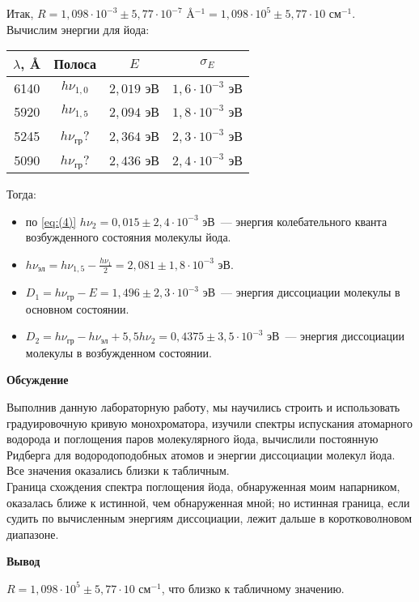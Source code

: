 \documentclass[12pt]{article}
\begin{document}
Итак, $R= 1,098 \cdot 10^{-3} \pm 5,77 \cdot 10^{-7}$ \AA$^{-1} = 1,098 \cdot
10^5 \pm 5,77\cdot 10$ см$^{-1}$.
\\
Вычислим энергии для йода:
\begin{center}
    \begin{tabular}{|c|c|c|c|}
      \hline
      $\lambda$, \AA & Полоса & $E$ & $\sigma_E$\\ \hline
      6140 &$h\nu_{1,0}$ & $2,019$ эВ & $1,6 \cdot 10^{-3}$ эВ\\ \hline
      5920 &$h\nu_{1,5}$ & $2,094$ эВ & $1,8 \cdot 10^{-3}$ эВ\\ \hline
      5245 &$h\nu_{\text{гр}}$? & $2,364$ эВ & $2,3 \cdot 10^{-3}$ эВ\\ \hline
      5090 &$h\nu_{\text{гр}}$? & $2,436$ эВ & $2,4 \cdot 10^{-3}$ эВ\\ \hline
    \end{tabular}
\end{center}
Тогда:
\begin{itemize}
    \item по \ref{eq:(4)} $h\nu_2 = 0,015 \pm 2,4 \cdot 10^{-3}$ эВ~---
    энергия колебательного кванта возбужденного состояния молекулы йода.
    \item $h\nu_{\text{эл}} = h\nu_{1,5} - \displaystyle \frac{h\nu_1}{2} =
    2,081 \pm 1,8 \cdot 10^{-3}$ эВ.
    \item $D_1 = h\nu_{\text{гр}} - E = 1,496 \pm 2,3\cdot 10^{-3}$ эВ~---
    энергия диссоциации молекулы в основном состоянии.
    \item $D_2 = h\nu_{\text{гр}}-h\nu_{\text{эл}} + 5,5h\nu_2 = 0,4375 \pm 3,5
    \cdot 10^{-3}$ эВ~--- энергия диссоциации молекулы в возбужденном состоянии.

\end{itemize}
\begin{center}
    \textbf{Обсуждение}
\end{center}
Выполнив данную лабораторную работу, мы научились строить и использовать
градуировочную кривую монохроматора, изучили спектры испускания атомарного
водорода и поглощения паров молекулярного йода, вычислили постоянную Ридберга
для водородоподобных атомов и энергии диссоциации молекул йода.
\\
Все значения оказались близки к табличным.
\\
Граница схождения спектра поглощения йода, обнаруженная моим напарником,
оказалась ближе к истинной, чем обнаруженная мной; но истинная граница, если
судить по вычисленным энергиям диссоциации, лежит дальше в коротковолновом
диапазоне.
\begin{center}
    \textbf{Вывод}
\end{center}
$R= 1,098 \cdot 10^5 \pm 5,77\cdot 10$ см$^{-1}$, что близко к табличному значению.
\end{document}
